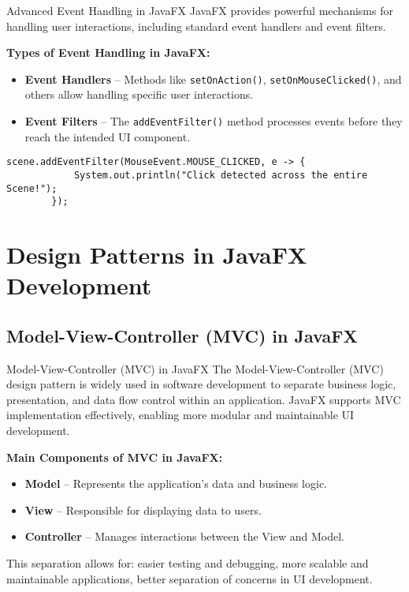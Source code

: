 \documentclass[aspectratio=169, table]{beamer}
\begin{document}
\begin{frame}[fragile]{Advanced Event Handling in JavaFX}
	\vspace{20pt}
	JavaFX provides powerful mechanisms for handling user interactions,  
	including standard event handlers and event filters.
	
	\bigskip
	\textbf{Types of Event Handling in JavaFX:}
	\begin{itemize}
		\item \textbf{Event Handlers} – Methods like \texttt{setOnAction()}, \texttt{setOnMouseClicked()},  
		and others allow handling specific user interactions.
		\item \textbf{Event Filters} – The \texttt{addEventFilter()} method processes events  
		before they reach the intended UI component.
	\end{itemize}
	
	\bigskip
	\begin{lstlisting}[style=JavaStyle]
		scene.addEventFilter(MouseEvent.MOUSE_CLICKED, e -> {
			System.out.println("Click detected across the entire Scene!");
		});
	\end{lstlisting}
	
\end{frame}

\section{Design Patterns in JavaFX Development}

\subsection{Model-View-Controller (MVC) in JavaFX}

\begin{frame}[fragile]{Model-View-Controller (MVC) in JavaFX}
	\vspace{20pt}
	The Model-View-Controller (MVC) design pattern is widely used in software development  
	to separate business logic, presentation, and data flow control within an application.  
	JavaFX supports MVC implementation effectively, enabling more modular and maintainable UI development.
	
	\bigskip
	\textbf{Main Components of MVC in JavaFX:}
	\begin{itemize}
		\item \textbf{Model} – Represents the application’s data and business logic.
		\item \textbf{View} – Responsible for displaying data to users.
		\item \textbf{Controller} – Manages interactions between the View and Model.
	\end{itemize}
	
	\bigskip
	This separation allows for: easier testing and debugging, more scalable and maintainable applications, better separation of concerns in UI development.
\end{frame}
\end{document}
